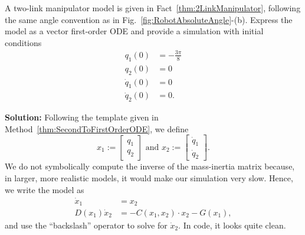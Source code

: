 \begin{example}
\label{ex:2LinkManipulatorFirstOrderODE}
A two-link manipulator model is given in Fact~\ref{thm:2LinkManipulator}, following the same angle convention as in Fig.~\ref{fig:RobotAbsoluteAngle}-(b). Express the model as a vector first-order ODE and provide a simulation with initial conditions 
\begin{align*}
    q_1(0) &= -\frac{3\pi}{8} \\
    q_2(0) & =0\\
    \dot{q}_1(0)&=0 \\
    \dot{q}_2(0) & = 0.
\end{align*}
\end{example}
\textbf{Solution:} Following the template given in Method~\ref{thm:SecondToFirstOrderODE}, we define
$$ x_1:= \left[ \begin{array}{c} q_1 \\
q_2
\end{array} \right] \text{ and } x_2:= \left[ \begin{array}{c} \dot{q}_1 \\
\dot{q}_2
\end{array} \right] .$$
We do not symbolically compute the inverse of the mass-inertia matrix because, in larger, more realistic models, it would make our simulation very slow. Hence, we write the model as
\begin{align*}
    \dot{x}_1 &= x_2 \\[1em]
    D(x_1) \dot{x}_2 & = -C(x_1, x_2)\cdot x_2 - G(x_1),
\end{align*}
and use the ``backslash'' operator to solve for $\dot{x}_2$. In code, it looks quite clean.

